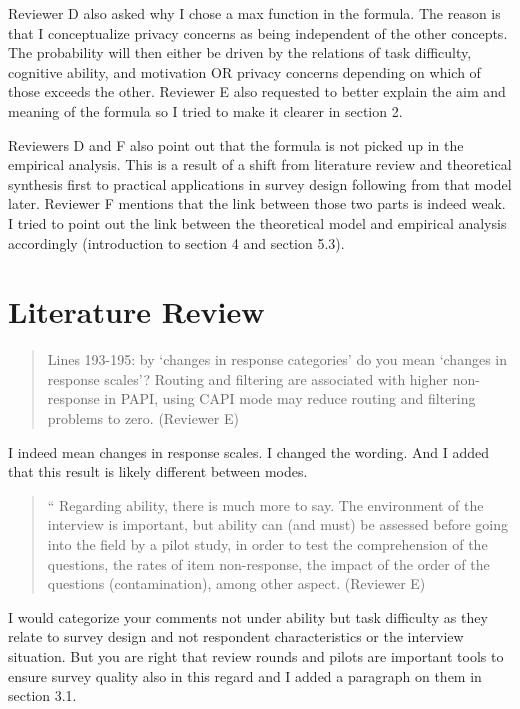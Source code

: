 \documentclass[a4paper, 12pt]{article}
\begin{document}
Reviewer D also asked why I chose a max function in the formula. The reason is that I conceptualize privacy concerns as being independent of the other concepts. The probability will then either be driven by the relations of task difficulty, cognitive ability, and motivation OR privacy concerns depending on which of those exceeds the other. Reviewer E also requested to better explain the aim and meaning of the formula so I tried to make it clearer in section 2.

Reviewers D and F also point out that the formula is not picked up in the empirical analysis. This is a result of a shift from literature review and theoretical synthesis first to practical applications in survey design following from that model later. Reviewer F mentions that the link between those two parts is indeed weak. I tried to point out the link between the theoretical model and empirical analysis accordingly (introduction to section 4 and section 5.3).


\section{Literature Review}

\begin{quotation}
Lines 193-195: by ‘changes in response categories’ do you mean ‘changes in response scales’? Routing and filtering are associated with higher non-response in PAPI, using CAPI mode may reduce routing and filtering problems to zero. (Reviewer E)
\end{quotation}

I indeed mean changes in response scales. I changed the wording. And I added that this result is likely different between modes.

\begin{quotation}
`` Regarding ability, there is much more to say. The environment of the interview is important, but ability can (and must) be assessed before going into the field by a pilot study, in order to test the comprehension of the questions, the rates of item non-response, the impact of the order of the questions (contamination), among other aspect. (Reviewer E)
\end{quotation}

I would categorize your comments not under ability but task difficulty as they relate to survey design and not respondent characteristics or the interview situation. But you are right that review rounds and pilots are important tools to ensure survey quality also in this regard and I added a paragraph on them in section 3.1.
\end{document}
